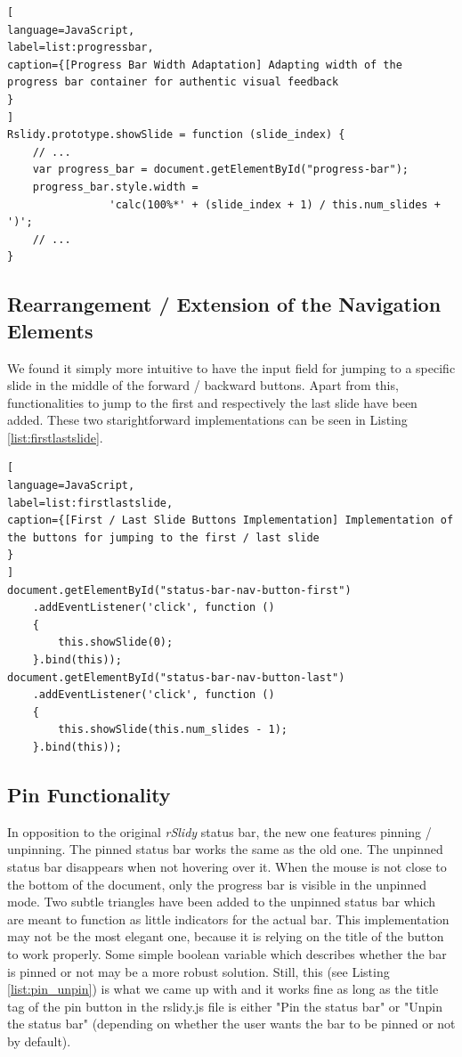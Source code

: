 \begin{lstlisting}[
language=JavaScript,
label=list:progressbar,
caption={[Progress Bar Width Adaptation] Adapting width of the progress bar container for authentic visual feedback
}
]
Rslidy.prototype.showSlide = function (slide_index) {
	// ...
	var progress_bar = document.getElementById("progress-bar");
	progress_bar.style.width =
				'calc(100%*' + (slide_index + 1) / this.num_slides + ')';
	// ...
}
\end{lstlisting}

\subsection{Rearrangement / Extension of the Navigation Elements}
We found it simply more intuitive to have the input field for jumping to a specific slide in the middle of the forward / backward buttons. Apart from this, functionalities to jump to the first and respectively the last slide have been added. These two starightforward implementations can be seen in Listing \ref{list:firstlastslide}.

\begin{minipage}{\linewidth}
\begin{lstlisting}[
language=JavaScript,
label=list:firstlastslide,
caption={[First / Last Slide Buttons Implementation] Implementation of the buttons for jumping to the first / last slide
}
]
document.getElementById("status-bar-nav-button-first")
	.addEventListener('click', function ()
	{
		this.showSlide(0);
	}.bind(this));
document.getElementById("status-bar-nav-button-last")
	.addEventListener('click', function ()
	{
		this.showSlide(this.num_slides - 1);
	}.bind(this));
\end{lstlisting}
\end{minipage}



\subsection{Pin Functionality}
In opposition to the original \textit{rSlidy} status bar, the new one features pinning / unpinning. The pinned status bar works the same as the old one. The unpinned status bar disappears when not hovering over it. When the mouse is not close to the bottom of the document, only the progress bar is visible in the unpinned mode. Two subtle triangles have been added to the unpinned status bar which are meant to function as little indicators for the actual bar. This implementation may not be the most elegant one, because it is relying on the title of the button to work properly. Some simple boolean variable which describes whether the bar is pinned or not may be a more robust solution. Still, this (see Listing \ref{list:pin_unpin}) is what we came up with and it works fine as long as the title tag of the pin button in the rslidy.js file is either "Pin the status bar" or "Unpin the status bar" (depending on whether the user wants the bar to be pinned or not by default).


